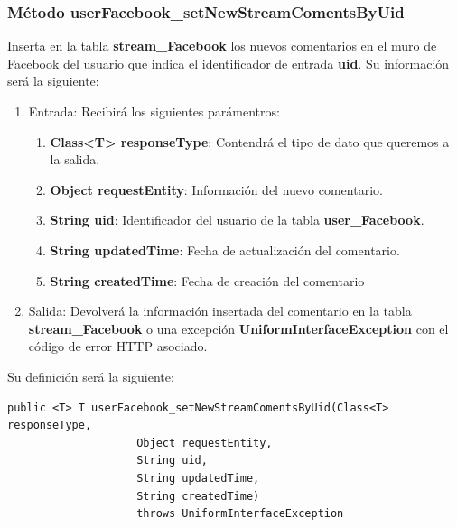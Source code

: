 \subsubsection{Método userFacebook\_setNewStreamComentsByUid}
Inserta en la tabla \textbf{stream\_Facebook} los nuevos comentarios en el muro de Facebook del usuario que indica el identificador de entrada \textbf{uid}. Su información será la siguiente:
\begin{enumerate}
\item Entrada: Recibirá los siguientes parámentros:
\begin{enumerate}
\item \textbf{Class<T> responseType}: Contendrá el tipo de dato que queremos a la salida. 
\item \textbf{Object requestEntity}: Información del nuevo comentario.
\item \textbf{String uid}: Identificador del usuario de la tabla \textbf{user\_Facebook}.
\item \textbf{String updatedTime}: Fecha de actualización del comentario.
\item \textbf{String createdTime}: Fecha de creación del comentario
\end{enumerate}
\item Salida: Devolverá la información insertada del comentario en la tabla \textbf{stream\_Facebook} o una excepción \textbf{UniformInterfaceException} con el código de error HTTP asociado.
\end{enumerate}
\bigskip
\par
Su definición será la siguiente:
\begin{verbatim}public <T> T userFacebook_setNewStreamComentsByUid(Class<T> responseType, 
					Object requestEntity, 
					String uid, 
					String updatedTime, 
					String createdTime) 
					throws UniformInterfaceException\end{verbatim}

